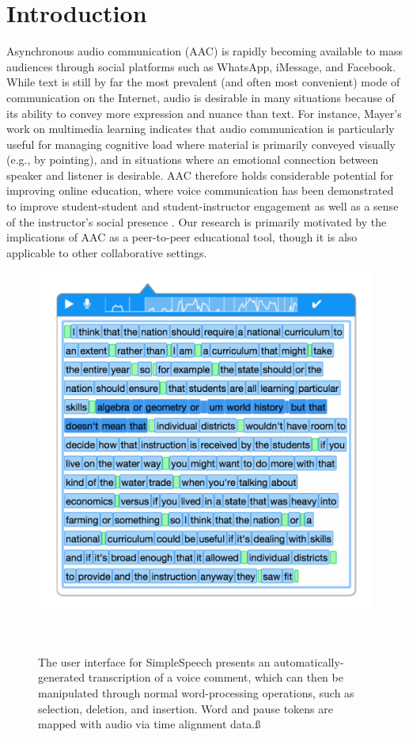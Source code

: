\section{Introduction}

Asynchronous audio communication (AAC) is rapidly becoming available to mass audiences through social platforms such as WhatsApp, iMessage, and Facebook. 
While text is still by far the most prevalent (and often most convenient) mode of communication on the Internet, audio is desirable in many situations because of its ability to convey more expression and nuance than text.
For instance, Mayer's work on multimedia learning \cite{mayer} indicates that audio communication is particularly useful for managing cognitive load where material is primarily conveyed visually (e.g., by pointing), and in situations where an emotional connection between speaker and listener is desirable.
AAC therefore holds considerable potential for improving online education, where voice communication has been demonstrated to improve student-student and student-instructor engagement as well as a sense of the instructor's social presence \cite{ice,oomen,tu}. 
Our research is primarily motivated by the implications of AAC as a peer-to-peer educational tool, though it is also applicable to other collaborative settings.

\begin{figure}
	\centering
	\includegraphics[width=\columnwidth,keepaspectratio]{figures/large_screenshot}
	\caption{The user interface for SimpleSpeech presents an automatically-generated transcription of a voice comment, which can then be manipulated through normal word-processing operations, such as selection, deletion, and insertion. Word and pause tokens are mapped with audio via time alignment data.ß}~\label{fig:overview_shot}
\end{figure}

